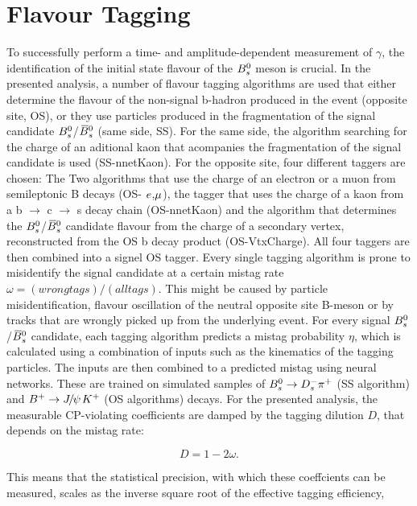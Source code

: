 \clearpage
\section{Flavour Tagging}
\label{sec:Tagging}
To successfully perform a time- and amplitude-dependent measurement of $\gamma$, the identification of the initial state flavour of the ${{B}^0_{s}}$ meson is crucial.
In the presented analysis, a number of flavour tagging algorithms are used that either determine the flavour of the non-signal b-hadron produced in the event (opposite site, OS), 
or they use particles produced in the fragmentation of the signal candidate ${{B}^0_{s}}$/${{\kern 0.18em\overline{\kern -0.18em B}{}}{}^0_{s}}$ (same side, SS). \newline
For the same side, the algorithm searching for the charge of an aditional kaon that acompanies the fragmentation of the signal candidate is used (SS-nnetKaon). For the opposite site, four different taggers are chosen: 
The Two algorithms that use the charge of an electron or a muon from semileptonic B decays (OS- ${e}$,${\mu}$), the tagger that uses the charge of a kaon from a b $\to$ c $\to$ s decay chain (OS-nnetKaon) 
and the algorithm that determines the ${{B}^0_{s}}$/${{\kern 0.18em\overline{\kern -0.18em B}{}}{}^0_{s}}$ candidate flavour from the charge of a secondary vertex, reconstructed from the OS b decay product (OS-VtxCharge). 
All four taggers are then combined into a signel OS tagger. \newline
Every single tagging algorithm is prone to misidentify the signal candidate at a certain mistag rate $\omega = (wrong tags)/ (all tags)$. 
This might be caused by particle misidentification, flavour oscillation of the neutral opposite site B-meson or by tracks that are wrongly picked up from the underlying event. 
For every signal ${{B}^0_{s}}$/${{\kern 0.18em\overline{\kern -0.18em B}{}}{}^0_{s}}$ candidate, each tagging algorithm predicts a mistag probability $\eta$, which is calculated using a combination of inputs such as the kinematics of the tagging particles. 
The inputs are then combined to a predicted mistag using neural networks. These are trained on simulated samples of ${{B}^0_{s}}\rightarrow{\ensuremath{{D}^-_{s}}}{\ensuremath{{\pi}^+}}$ (SS algorithm) and ${{B}^+}\rightarrow{\ensuremath{{J\mskip -3mu/\mskip -2mu\psi\mskip 2mu}}}{\ensuremath{{K}^+}}$ (OS algorithms) decays.
For the presented analysis, the measurable CP-violating coefficients are damped by the tagging dilution $D$, that depends on the mistag rate:

\begin{equation}
\label{eq: taggingDilution}
D = 1 - 2\omega.
\end{equation}

This means that the statistical precision, with which these coeffcients can be measured, scales as the inverse square root of the effective tagging efficiency,


